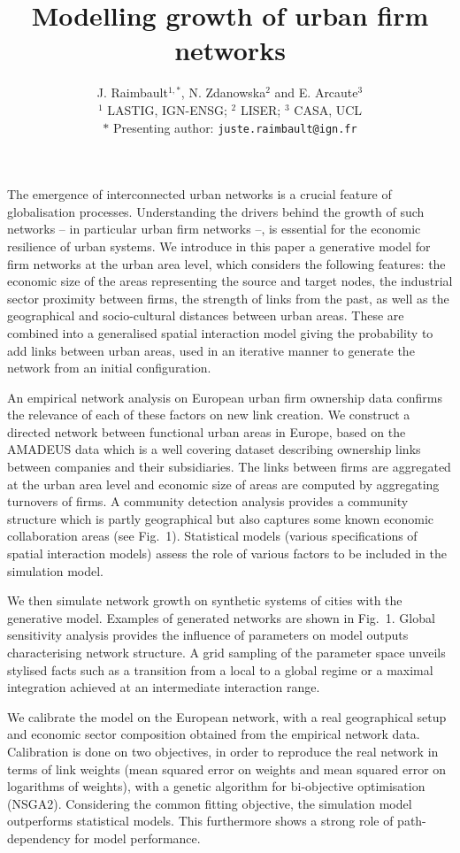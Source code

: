 \documentclass[10pt]{article}
\title{\vspace{-2cm}Modelling growth of urban firm networks}
\author{J. Raimbault$^{1,\ast}$, N. Zdanowska$^2$ and E. Arcaute$^3$\smallskip\\
$^1$ LASTIG, IGN-ENSG; $^2$ LISER; $^3$ CASA, UCL\\\smallskip
$\ast$ Presenting author: \texttt{juste.raimbault@ign.fr}
}
\date{}
\begin{document}
\maketitle


The emergence of interconnected urban networks is a crucial feature of globalisation processes. Understanding the drivers behind the growth of such networks -- in particular urban firm networks --, is essential for the economic resilience of urban systems. We introduce in this paper a generative model for firm networks at the urban area level, which considers the following features: the economic size of the areas representing the source and target nodes, the industrial sector proximity between firms, the strength of links from the past, as well as the geographical and socio-cultural distances between urban areas. These are combined into a generalised spatial interaction model giving the probability to add links between urban areas, used in an iterative manner to generate the network from an initial configuration.

An empirical network analysis on European urban firm ownership data confirms the relevance of each of these factors on new link creation. We construct a directed network between functional urban areas in Europe, based on the AMADEUS data which is a well covering dataset describing ownership links between companies and their subsidiaries. The links between firms are aggregated at the urban area level and economic size of areas are computed by aggregating turnovers of firms. A community detection analysis provides a community structure which is partly geographical but also captures some known economic collaboration areas (see Fig.~1). Statistical models (various specifications of spatial interaction models) assess the role of various factors to be included in the simulation model.

We then simulate network growth on synthetic systems of cities with the generative model. Examples of generated networks are shown in Fig.~1. Global sensitivity analysis provides the influence of parameters on model outputs characterising network structure. A grid sampling of the parameter space unveils stylised facts such as a transition from a local to a global regime or a maximal integration achieved at an intermediate interaction range.

We calibrate the model on the European network, with a real geographical setup and economic sector composition obtained from the empirical network data. Calibration is done on two objectives, in order to reproduce the real network in terms of link weights (mean squared error on weights and mean squared error on logarithms of weights), with a genetic algorithm for bi-objective optimisation (NSGA2). Considering the common fitting objective, the simulation model outperforms statistical models. This furthermore shows a strong role of path-dependency for model performance.
\end{document}
